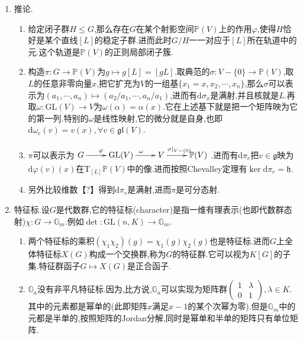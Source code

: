 \begin{enumerate}
\begin{proof}
    	取$g\in G$满足$R_gL=L$,按照理想$I$被$M$生成,就有$R_g(I)=R_g(MK[G])=R_g(M)R_g(K[G])=MA=I$.进而有$g\in H$.反过来如果$h\in H$,那么$R_h(M)=R_h(W)\cap R_h(I)=W\cap I=M$.再取$v\in\mathfrak{g}$满足$D_v(M)\subseteq M$,进而有:$D_v(I)=D_v(MK[G])\subseteq(D_vM)K[G]+M(D_vK[G])\subseteq MK[G]=I$.于是$v\in\mathfrak{h}$.反过来我们已经解释了如果$v\in\mathfrak{h}$,那么$D_v(M)\subseteq M$.
    \end{proof}
    \item 推论.
    \begin{enumerate}[(1)]
    	\item 给定闭子群$H\le G$,那么存在$G$在某个射影空间$\mathbb{P}(V)$上的作用$\varphi$,使得$H$恰好是某个直线$[L]$的稳定子群.进而此时$G/H$一一对应于$[L]$所在轨道中的元.这个轨道是$\mathbb{P}(V)$的正则局部闭子簇.
    	\item 构造$\pi:G\to\mathbb{P}(V)$为$g\mapsto g[L]=[gL]$.取典范的$\sigma:V-\{0\}\to\mathbb{P}(V)$,取$L$的任意非零向量$x$,把它扩充为$V$的一组基$\{x_1=x,x_2,\cdots,x_n\}$,那么$\sigma$可以表示为$(a_1,\cdots,a_n)\mapsto(a_2/a_1,\cdots,a_n/a_1)$,进而有$\mathrm{d}\sigma_x$是满射,并且核就是$L$.再取$\omega:\mathrm{GL}(V)\to V$为$\omega(\alpha)=\alpha(x)$.它在上述基下就是把一个矩阵映为它的第一列.特别的$\omega$是线性映射,它的微分就是自身,也即$\mathrm{d}\omega_e(v)=v(x),\forall v\in\mathfrak{gl}(V)$.
    	\item $\pi$可以表示为$\xymatrix{G\ar[r]^{\varphi}&\mathrm{GL}(V)\ar[r]^{\omega}&V\ar[r]^{\sigma\mid_{V-\{0\}}}&\mathbb{P}(V)}$.进而有$\mathrm{d}\pi_e$把$v\in\mathfrak{g}$映为$\mathrm{d}\varphi(v)(x)$在$\mathrm{T}_{[L]}\mathbb{P}(V)$中的像.进而按照Chevalley定理有$\ker\mathrm{d}\pi_e=\mathfrak{h}$.
    	\item 另外比较维数【?】得到$\mathrm{d}\pi_e$是满射,进而$\pi$是可分态射.
    \end{enumerate}
    \item 特征标.设$G$是代数群,它的特征标(character)是指一维有理表示(也即代数群态射)$\chi:G\to\mathbb{G}_m$.例如$\det:\mathrm{GL}(n,K)\to\mathbb{G}_m$.
    \begin{enumerate}[(1)]
    	\item 两个特征标的乘积$(\chi_1\chi_2)(g)=\chi_1(g)\chi_2(g)$也是特征标.进而$G$上全体特征标$X(G)$构成一个交换群,称为$G$的特征群.它可以视为$K[G]$的子集.特征群函子$G\mapsto X(G)$是正合函子.
    	\item $\mathbb{G}_a$没有非平凡特征标.因为,比方说,$\mathbb{G}_a$可以实现为矩阵群$\left(\begin{array}{cc}1&\lambda\\0&1\end{array}\right),\lambda\in K$.其中的元素都是幂单的(此即矩阵$x$满足$x-1$的某个次幂为零).但是$\mathbb{G}_m$中的元都是半单的,按照矩阵的Jordan分解,同时是幂单和半单的矩阵只有单位矩阵.

\end{enumerate}
\end{enumerate}
